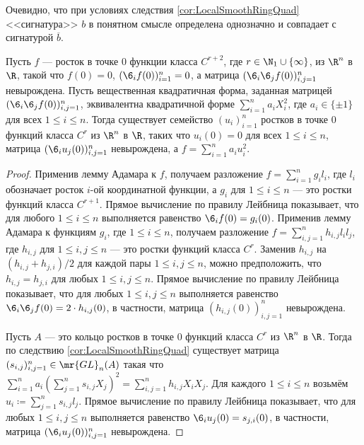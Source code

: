 \documentclass[
	extrafontsizes,
	11pt,
	hyphens,
]{memoir}
\begin{document}
\begin{remark}
Очевидно, что при условиях следствия \ref{cor:LocalSmoothRingQuad} <<сигнатура>> \(b\) в понятном смысле определена однозначно и совпадает с сигнатурой \(\overline{b}\).
\end{remark}

\begin{theorem}
Пусть \(f\) --- росток в точке \(0\) функции класса \(C^{r+2}\), где \(r \in \N_1 \cup \{\infty\}\),
из \(\R^n\) в \(\R\),
такой что \(f(0) = 0\),
\((\6_i f(0))_{i=1}^n = 0\),
а матрица \((\6_i \6_j f(0))_{i,j=1}^n\) невырождена.
Пусть вещественная квадратичная форма, заданная матрицей \((\6_i \6_j f(0))_{i,j=1}^n\), эквивалентна квадратичной форме \(\sum_{i=1}^n a_i X_i^2\), где \(a_i \in \{\pm 1\}\)
для всех \(1 \leq i \leq n\).
Тогда существует семейство \((u_i)_{i=1}^n\) ростков в точке \(0\) функций класса \(C^r\) из \(\R^n\) в \(\R\), таких что
\(u_i(0) = 0\) для всех \(1 \leq i \leq n\),
матрица \((\6_i u_j (0))_{i,j=1}^n\) невырождена,
а \(f = \sum_{i = 1}^n a_i u_i^2\).
\end{theorem}

\begin{proof}
Применив лемму Адамара к \(f\), получаем разложение
\(f = \sum_{i=1}^n g_i l_i\),
где \(l_i\) обозначает росток \(i\)-ой координатной функции,
а \(g_i\) для \(1 \leq i \leq n\) --- это ростки функций класса \(C^{r+1}\).
Прямое вычисление по правилу Лейбница показывает, что
для любого \(1 \leq i \leq n\) выполняется равенство \(\6_i f(0) = g_i(0)\).
Применив лемму Адамара к функциям \(g_i\), где \(1 \leq i \leq n\), получаем разложение
\(f = \sum_{i,j = 1}^n h_{i,j} l_i l_j\),
где \(h_{i,j}\) для \(1 \leq i,j \leq n\) --- это ростки функций класса \(C^r\).
Заменив \(h_{i,j}\) на \((h_{i,j} + h_{j,i})/2\) для каждой пары \(1 \leq i,j \leq n\), можно предположить, что \(h_{i,j} = h_{j,i}\) для любых \(1 \leq i,j \leq n\).
Прямое вычисление по правилу Лейбница показывает, что
для любых \(1 \leq i,j \leq n\) выполняется равенство
\(\6_i \6_j f(0) = 2 \cdot h_{i,j}(0)\),
в частности, матрица \((h_{i,j}(0))_{i,j=1}^n\) невырождена.

Пусть \(A\) --- это кольцо ростков в точке \(0\) функций класса \(C^r\) из \(\R^n\) в \(\R\).
Тогда по следствию \ref{cor:LocalSmoothRingQuad} существует матрица \((s_{i,j})_{i,j = 1}^n \in \mr{GL}_n(A)\)
такая что \(\sum_{i=1}^n a_i (\sum_{j=1}^n s_{i,j} X_j)^2 = \sum_{i,j = 1}^n h_{i,j} X_i X_j\).
Для каждого \(1 \leq i \leq n\) возьмём \(u_i \coloneqq \sum_{j=1}^n s_{i,j} l_j\).
Прямое вычисление по правилу Лейбница показывает, что для любых \(1 \leq i,j \leq n\) выполняется равенство \(\6_i u_j (0) = s_{j,i}(0)\), в частности, матрица \((\6_i u_j (0))_{i,j=1}^n\) невырождена.
\end{proof}
\end{document}

